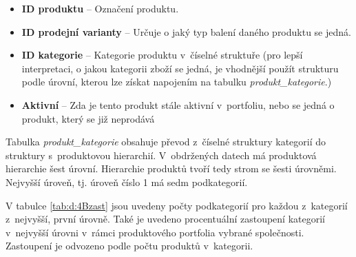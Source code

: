 \begin{itemize}
    \itemsep0em 
    \item \textbf{ID produktu} -- Označení produktu.
    \item \textbf{ID prodejní varianty} -- Určuje o jaký typ balení daného produktu se jedná.
    \item \textbf{ID kategorie} -- Kategorie produktu v~číselné struktuře (pro lepší interpretaci, o jakou kategorii zboží se jedná, je vhodnější použít strukturu podle úrovní, kterou lze získat napojením na tabulku \emph{produkt\_kategorie}.)
    \item \textbf{Aktivní} --  Zda je tento produkt stále aktivní v~portfoliu, nebo se jedná o produkt, který se již neprodává
\end{itemize}

Tabulka \emph{produkt\_kategorie} obsahuje převod z~číselné struktury kategorií do struktury s~produktovou hierarchií. V~obdržených datech má produktová hierarchie šest úrovní. Hierarchie produktů tvoří tedy strom se šesti úrovněmi. Nejvyšší úroveň, tj. úroveň číslo 1 má sedm podkategorií.

V tabulce \ref*{tab:d:4Bzast} jsou uvedeny počty podkategorií pro každou z~kategorií z~nejvyšší, první úrovně. Také je uvedeno procentuální zastoupení kategorií v~nejvyšší úrovni v~rámci produktového portfolia vybrané společnosti. Zastoupení je odvozeno podle počtu produktů v~kategorii.

